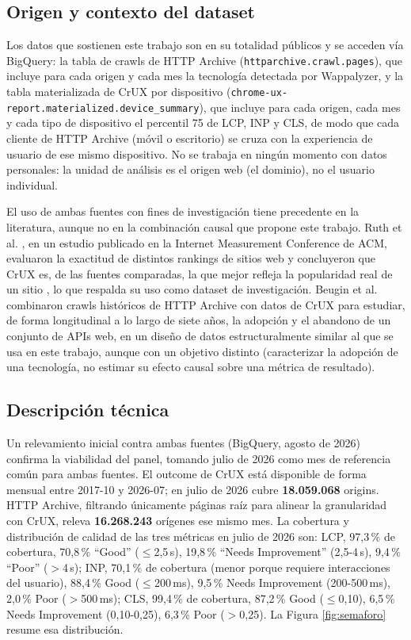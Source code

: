 \documentclass[12pt, a4paper]{article}
\begin{document}
\subsection{Origen y contexto del dataset}

Los datos que sostienen este trabajo son en su totalidad públicos y se acceden vía BigQuery: la tabla de crawls de HTTP Archive (\texttt{httparchive.crawl.pages}), que incluye para cada origen y cada mes la tecnología detectada por Wappalyzer, y la tabla materializada de CrUX por dispositivo (\texttt{chrome-ux-report.materialized.device\_summary}), que incluye para cada origen, cada mes y cada tipo de dispositivo el percentil 75 de LCP, INP y CLS, de modo que cada cliente de HTTP Archive (móvil o escritorio) se cruza con la experiencia de usuario de ese mismo dispositivo. No se trabaja en ningún momento con datos personales: la unidad de análisis es el origen web (el dominio), no el usuario individual.

El uso de ambas fuentes con fines de investigación tiene precedente en la literatura, aunque no en la combinación causal que propone este trabajo. Ruth et al. \cite{ruth2022toppling}, en un estudio publicado en la Internet Measurement Conference de ACM, evaluaron la exactitud de distintos rankings de sitios web y concluyeron que CrUX es, de las fuentes comparadas, la que mejor refleja la popularidad real de un sitio \cite{chromedev2025cruxmethodology}, lo que respalda su uso como dataset de investigación. Beugin et al. \cite{beugin2026lessons} combinaron crawls históricos de HTTP Archive con datos de CrUX para estudiar, de forma longitudinal a lo largo de siete años, la adopción y el abandono de un conjunto de APIs web, en un diseño de datos estructuralmente similar al que se usa en este trabajo, aunque con un objetivo distinto (caracterizar la adopción de una tecnología, no estimar su efecto causal sobre una métrica de resultado).

\subsection{Descripción técnica}

Un relevamiento inicial contra ambas fuentes (BigQuery, agosto de 2026) confirma la viabilidad del panel, tomando julio de 2026 como mes de referencia común para ambas fuentes. El outcome de CrUX está disponible de forma mensual entre 2017-10 y 2026-07; en julio de 2026 cubre \textbf{18.059.068} origins. HTTP Archive, filtrando únicamente páginas raíz para alinear la granularidad con CrUX, releva \textbf{16.268.243} orígenes ese mismo mes. La cobertura y distribución de calidad de las tres métricas en julio de 2026 son: LCP, 97,3\,\% de cobertura, 70,8\,\% ``Good'' ($\leq$2,5\,s), 19,8\,\% ``Needs Improvement'' (2,5-4\,s), 9,4\,\% ``Poor'' ($>$4\,s); INP, 70,1\,\% de cobertura (menor porque requiere interacciones del usuario), 88,4\,\% Good ($\leq$200\,ms), 9,5\,\% Needs Improvement (200-500\,ms), 2,0\,\% Poor ($>$500\,ms); CLS, 99,4\,\% de cobertura, 87,2\,\% Good ($\leq$0,10), 6,5\,\% Needs Improvement (0,10-0,25), 6,3\,\% Poor ($>$0,25). La Figura \ref{fig:semaforo} resume esa distribución.
\end{document}
